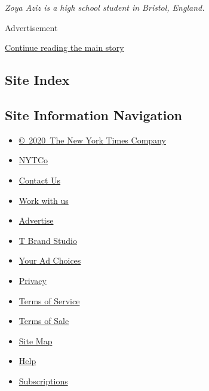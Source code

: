\emph{Zoya Aziz is a high school student in Bristol, England.}

Advertisement

\protect\hyperlink{after-bottom}{Continue reading the main story}

\hypertarget{site-index}{%
\subsection{Site Index}\label{site-index}}

\hypertarget{site-information-navigation}{%
\subsection{Site Information
Navigation}\label{site-information-navigation}}

\begin{itemize}
\tightlist
\item
  \href{https://help.nytimes3xbfgragh.onion/hc/en-us/articles/115014792127-Copyright-notice}{©~2020~The
  New York Times Company}
\end{itemize}

\begin{itemize}
\tightlist
\item
  \href{https://www.nytco.com/}{NYTCo}
\item
  \href{https://help.nytimes3xbfgragh.onion/hc/en-us/articles/115015385887-Contact-Us}{Contact
  Us}
\item
  \href{https://www.nytco.com/careers/}{Work with us}
\item
  \href{https://nytmediakit.com/}{Advertise}
\item
  \href{http://www.tbrandstudio.com/}{T Brand Studio}
\item
  \href{https://www.nytimes3xbfgragh.onion/privacy/cookie-policy\#how-do-i-manage-trackers}{Your
  Ad Choices}
\item
  \href{https://www.nytimes3xbfgragh.onion/privacy}{Privacy}
\item
  \href{https://help.nytimes3xbfgragh.onion/hc/en-us/articles/115014893428-Terms-of-service}{Terms
  of Service}
\item
  \href{https://help.nytimes3xbfgragh.onion/hc/en-us/articles/115014893968-Terms-of-sale}{Terms
  of Sale}
\item
  \href{https://spiderbites.nytimes3xbfgragh.onion}{Site Map}
\item
  \href{https://help.nytimes3xbfgragh.onion/hc/en-us}{Help}
\item
  \href{https://www.nytimes3xbfgragh.onion/subscription?campaignId=37WXW}{Subscriptions}
\end{itemize}
